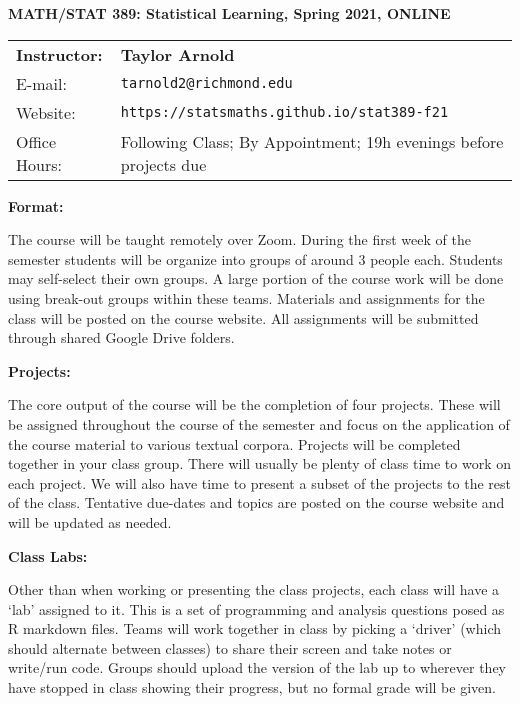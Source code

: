 \documentclass[12pt, a4paper]{article}
\begin{document}
\begin{center}
\textbf{MATH/STAT 389: Statistical Learning, Spring 2021, ONLINE}
\end{center}

\noindent
\begin{tabular}{ l l }
\textbf{Instructor:} &  \textbf{Taylor Arnold} \\
E-mail: & \texttt{tarnold2@richmond.edu} \\
Website: & \texttt{https://statsmaths.github.io/stat389-f21} \\
Office Hours: & Following Class; By Appointment; 19h evenings before projects due
\end{tabular}

\vspace{0.5cm}

\textbf{Format:} \vspace{6pt}

The course will be taught remotely over Zoom. During the first week of the
semester students will be organize into groups of around 3 people each.
Students may self-select their own groups. A large portion of the course work
will be done using break-out groups within these teams. Materials and
assignments for the class will be posted on the course website. All assignments
will be submitted through shared Google Drive folders.

\vspace{12pt}

\textbf{Projects:} \vspace{6pt}

The core output of the course will be the completion of four projects. These
will be assigned throughout the course of the semester and focus on the
application of the course material to various textual corpora. Projects will
be completed together in your class group. There will usually be plenty of
class time to work on each project. We will also have time to present a subset
of the projects to the rest of the class. Tentative due-dates and topics are
posted on the course website and will be updated as needed.

\vspace{12pt}

\textbf{Class Labs:} \vspace{6pt}

Other than when working or presenting the class projects, each class will have
a `lab' assigned to it. This is a set of programming and analysis questions
posed as R markdown files. Teams will work together in class by picking a
`driver' (which should alternate between classes) to share their screen and
take notes or write/run code. Groups should upload the version of the lab up to
wherever they have stopped in class showing their progress, but no formal grade
will be given.
\end{document}
